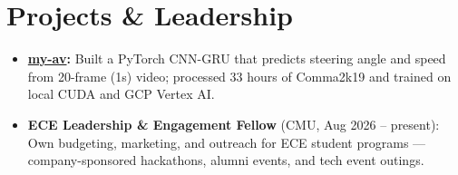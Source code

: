\documentclass[11pt, letterpaper]{article}
\begin{document}
\section{Projects \& Leadership}
\begin{itemize}
  \item \textbf{\href{https://github.com/lordphone/my-av}{my-av}:} Built a PyTorch CNN-GRU that predicts steering angle and speed from 20-frame (1s) video; processed 33 hours of Comma2k19 and trained on local CUDA and GCP Vertex AI.
  \item \textbf{ECE Leadership \& Engagement Fellow} (CMU, Aug 2026 -- present): Own budgeting, marketing, and outreach for ECE student programs --- company-sponsored hackathons, alumni events, and tech event outings.
\end{itemize}
\end{document}
